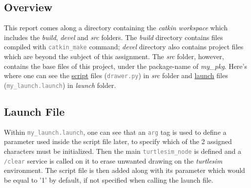 \documentclass[conference]{IEEEtran}
\newcommand{\command}[1]{\textcolor{gray}{\footnotesize \texttt{#1}}}
\begin{document}
\subsection{Overview}
This report comes along a directory containing the \textit{catkin workspace} which includes the \textit{build}, \textit{devel} and \textit{src} folders. The \textit{build} directory contains files compiled with \command{catkin\_make} command; \textit{devel} directory also contains project files which are beyond the subject of this assignment. The \textit{src} folder, however, contains the base files of this project, under the package-name of \textit{my\_pkg}. Here's where one can see the \underline{script} files (\command{drawer.py}) in \textit{src} folder and \underline{launch} files (\command{my\_launch.launch}) in \textit{launch} folder.
\subsection{Launch File}
Within \command{my\_launch.launch}, one can see that an \command{arg} tag is used to define a parameter used inside the script file later, to specify which of the 2 assigned characters must be initialized. Then the main \command{turtlesim\_node} is defined and a \command{/clear} service is called on it to erase unwanted drawing on the \textit{turtlesim} environment. The script file is then added along with its parameter which would be equal to '1' by default, if not specified when calling the launch file.
\end{document}
